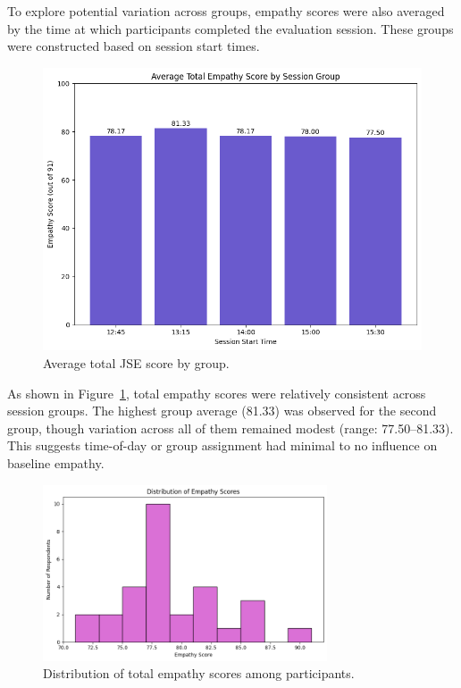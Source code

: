 To explore potential variation across groups, empathy scores were also averaged by the time at which participants completed the evaluation session. These groups were constructed based on session start times.

\begin{figure}[H]
    \centering
    \includegraphics[width=0.75\columnwidth]{../../Figures/avg score-by-group-pre.png}
    \caption{Average total JSE score by group.}
    \label{fig:group_scores_pre}
\end{figure}

As shown in Figure~\ref{fig:group_scores_pre}, total empathy scores were relatively consistent across session groups. The highest group average (81.33) was observed for the second group, though variation across all of them remained modest (range: 77.50–81.33). This suggests time-of-day or group assignment had minimal to no influence on baseline empathy.

\begin{figure}[htbp]
    \centering
    \includegraphics[width=0.75\textwidth]{../../Figures/avg-scores-summary-pre.png}
    \caption{Distribution of total empathy scores among participants.}
    \label{fig:score_distribution_pre}
\end{figure}


